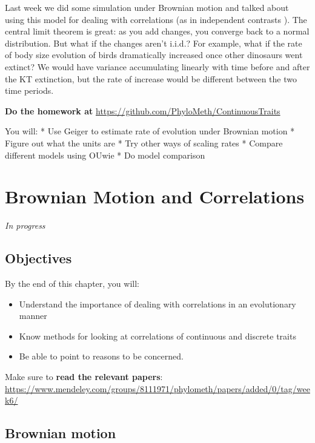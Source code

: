 \documentclass[]{book}
\providecommand{\tightlist}{%
  \setlength{\itemsep}{0pt}\setlength{\parskip}{0pt}}
\theoremstyle{definition}
\theoremstyle{definition}
\theoremstyle{remark}
\begin{document}
Last week we did some simulation under Brownian motion and talked about
using this model for dealing with correlations (as in independent
contrasts \citep{Felsenstein1985a}). The central limit theorem is great:
as you add changes, you converge back to a normal distribution. But what
if the changes aren't i.i.d.? For example, what if the rate of body size
evolution of birds dramatically increased once other dinosaurs went
extinct? We would have variance accumulating linearly with time before
and after the KT extinction, but the rate of increase would be different
between the two time periods.

\textbf{Do the homework at}
\url{https://github.com/PhyloMeth/ContinuousTraits}

You will: * Use Geiger to estimate rate of evolution under Brownian
motion * Figure out what the units are * Try other ways of scaling rates
* Compare different models using OUwie * Do model comparison

\chapter{Brownian Motion and
Correlations}\label{brownian-motion-and-correlations}

\emph{In progress}

\section{Objectives}\label{objectives-1}

By the end of this chapter, you will:

\begin{itemize}
\tightlist
\item
  Understand the importance of dealing with correlations in an
  evolutionary manner
\item
  Know methods for looking at correlations of continuous and discrete
  traits
\item
  Be able to point to reasons to be concerned.
\end{itemize}

Make sure to \textbf{read the relevant papers}:
\url{https://www.mendeley.com/groups/8111971/phylometh/papers/added/0/tag/week6/}

\section{Brownian motion}\label{brownian-motion}
\end{document}
